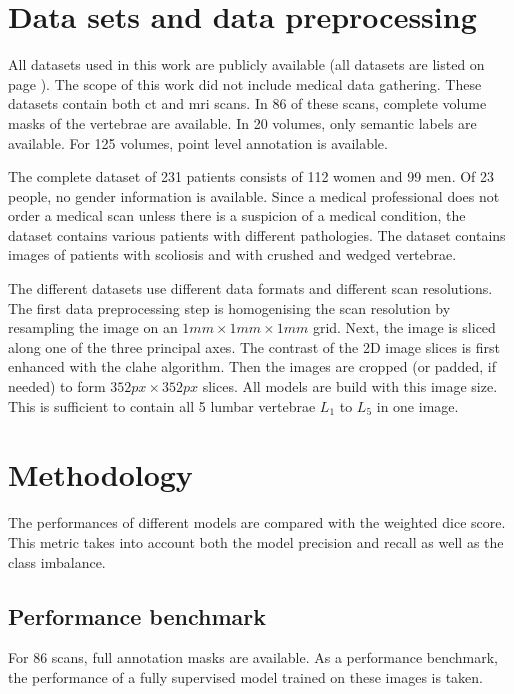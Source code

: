 \begin{multicols}{2}
\section*{Data sets and data preprocessing \label{sec:abstr_data}}
\par{
    All datasets used in this work are publicly available (all datasets are listed on page \pageref{sec:datasets}). 
    The scope of this work did not include medical data gathering.
    These datasets contain both \acrshort{ct} and \acrshort{mri} scans. 
    In 86 of these scans, complete volume masks of the vertebrae are available. 
    In 20 volumes, only semantic labels are available.
    For 125 volumes, point level annotation is available.
}
\par{
    The complete dataset of 231 patients consists of 112 women and 99 men. Of 23 people, no gender information is available. 
    Since a medical professional does not order a medical scan unless there is a suspicion of a medical condition, the dataset contains various patients with different pathologies.
    The dataset contains images of patients with scoliosis and with crushed and wedged vertebrae.
}
\par{
    The different datasets use different data formats and different scan resolutions. 
    The first data preprocessing step is homogenising the scan resolution by resampling the image on an $1mm\times 1mm\times 1mm$ grid. 
    Next, the image is sliced along one of the three principal axes.
    The contrast of the 2D image slices is first enhanced with the \acrfull{clahe} algorithm.
    Then the images are cropped (or padded, if needed) to form $352 px \times 352 px$ slices.
    All models are build with this image size. This is sufficient to contain all 5 lumbar vertebrae $L_1$ to $L_5$ in one image.
}


\section*{Methodology}
\par{
    The performances of different models are compared with the weighted dice score.
    This metric takes into account both the model precision and recall as well as the class imbalance.
}


\subsection*{Performance benchmark}
\par{
    For 86 scans, full annotation masks are available.
    As a performance benchmark, the performance of a fully supervised model trained on these images is taken.
}




\end{multicols}
